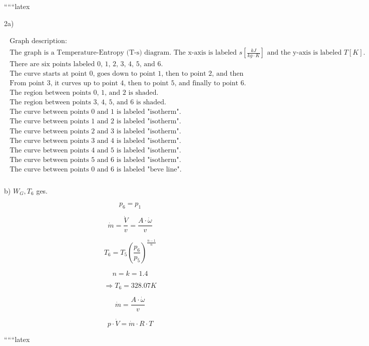 
``````latex


2a)

\[
\begin{array}{c}
\begin{array}{c}
\text{Graph description:} \\
\text{The graph is a Temperature-Entropy (T-s) diagram. The x-axis is labeled } s \left[ \frac{kJ}{kg \cdot K} \right] \text{ and the y-axis is labeled } T [K]. \\
\text{There are six points labeled 0, 1, 2, 3, 4, 5, and 6.} \\
\text{The curve starts at point 0, goes down to point 1, then to point 2, and then to point 3.} \\
\text{From point 3, it curves up to point 4, then to point 5, and finally to point 6.} \\
\text{The region between points 0, 1, and 2 is shaded.} \\
\text{The region between points 3, 4, 5, and 6 is shaded.} \\
\text{The curve between points 0 and 1 is labeled "isotherm".} \\
\text{The curve between points 1 and 2 is labeled "isotherm".} \\
\text{The curve between points 2 and 3 is labeled "isotherm".} \\
\text{The curve between points 3 and 4 is labeled "isotherm".} \\
\text{The curve between points 4 and 5 is labeled "isotherm".} \\
\text{The curve between points 5 and 6 is labeled "isotherm".} \\
\text{The curve between points 0 and 6 is labeled "beve line".} \\
\end{array}
\end{array}
\]

b) \( W_G, T_6 \) ges.

\[
p_6 = p_1
\]

\[
\dot{m} = \frac{\dot{V}}{v} = \frac{A \cdot \dot{\omega}}{v}
\]

\[
T_6 = T_5 \left( \frac{p_6}{p_5} \right)^{\frac{n-1}{n}}
\]

\[
n = k = 1.4
\]

\[
\Rightarrow T_6 = 328.07 K
\]

\[
\dot{m} = \frac{A \cdot \dot{\omega}}{v}
\]

\[
p \cdot \dot{V} = \dot{m} \cdot R \cdot T
\]

``````latex


